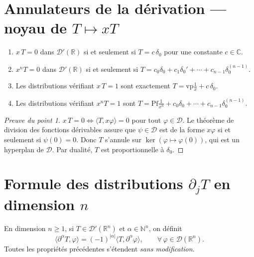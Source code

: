 \documentclass[12pt,a4paper,openany]{book}
\theoremstyle{definition}
\theoremstyle{plain}
\theoremstyle{remark}
\begin{document}
	\section{Annulateurs de la dérivation — noyau de $T \mapsto xT$}
	
	\begin{theorem}
		\begin{enumerate}
			\item $x\,T = 0$ dans $\mathcal{D}'(\mathbb{R})$ si et seulement si $T = c\,\delta_0$ pour une constante $c \in \mathbb{C}$.
			\item $x^n T = 0$ dans $\mathcal{D}'(\mathbb{R})$ si et seulement si
			$T = c_0\delta_0 + c_1\delta_0' + \cdots + c_{n-1}\delta_0^{(n-1)}$.
			\item Les distributions vérifiant $x\,T = 1$ sont exactement $T = \mathrm{vp}\frac{1}{x} + c\,\delta_0$.
			\item Les distributions vérifiant $x^n T = 1$ sont $T = \mathrm{Pf}\frac{1}{x^n} + c_0\delta_0 + \cdots + c_{n-1}\delta_0^{(n-1)}$.
		\end{enumerate}
	\end{theorem}
	
	\begin{proof}[Preuve du point 1]
		$x\,T = 0 \Leftrightarrow \langle T, x\varphi\rangle = 0$ pour tout $\varphi \in \mathcal{D}$.
		Le théorème de division des fonctions dérivables assure que $\psi \in \mathcal{D}$ est de la forme $x\varphi$ si et seulement si $\psi(0) = 0$.
		Donc $T$ s'annule sur $\ker(\varphi \mapsto \varphi(0))$, qui est un hyperplan de $\mathcal{D}$. Par dualité, $T$ est proportionnelle à $\delta_0$.
	\end{proof}
	
	\section{Formule des distributions \texorpdfstring{$\partial_j T$}{} en dimension \texorpdfstring{$n$}{n}}
	
	En dimension $n \geq 1$, si $T \in \mathcal{D}'(\mathbb{R}^n)$ et $\alpha \in \mathbb{N}^n$, on définit
	\[
	\langle \partial^\alpha T, \varphi \rangle = (-1)^{|\alpha|}\langle T, \partial^\alpha \varphi\rangle,
	\qquad \forall\,\varphi \in \mathcal{D}(\mathbb{R}^n).
	\]
	Toutes les propriétés précédentes s'étendent \emph{sans modification}.
	
\end{document}
